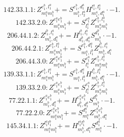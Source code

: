 \documentclass[letterpaper,10pt,fleqn,leqno,onecolumn]{article}
\begin{document}
\begin{equation} \;\;\;\;\;\;  142.33.1.1: Z^{e_{1}^{b},l_{1}^{a}}_{m_{1}^{a}m_{1}^{b}}+=S^{e_{1}^{b},d_{1}^{a}}_{m_{1}^{b},l_{2}^{a}}H^{l_{1}^{a},l_{2}^{a}}_{m_{1}^{a},d_{1}^{a}}\cdot -1. \end{equation}
\begin{equation} \;\;\;\;\;\;  142.33.2.0: Z^{e_{1}^{a}e_{1}^{b}}_{m_{1}^{a}m_{1}^{b}}+=S^{e_{1}^{a}}_{l_{1}^{a}}Z^{e_{1}^{b},l_{1}^{a}}_{m_{1}^{a}m_{1}^{b}} \end{equation}
\begin{equation} \;\;\;\;\;\;  206.44.1.2: Z^{l_{1}^{b},l_{1}^{a}}_{m_{1}^{b},d_{1}^{a}}+=H^{l_{1}^{b},l_{1}^{a}}_{d_{1}^{b},d_{1}^{a}}S^{d_{1}^{b}}_{m_{1}^{b}}\cdot -1. \end{equation}
\begin{equation} \;\;\;\;\;\;  206.44.2.1: Z^{e_{1}^{b},l_{1}^{a}}_{m_{1}^{a}m_{1}^{b}}+=S^{e_{1}^{b},d_{1}^{a}}_{m_{1}^{a},l_{1}^{b}}Z^{l_{1}^{b},l_{1}^{a}}_{m_{1}^{b},d_{1}^{a}} \end{equation}
\begin{equation} \;\;\;\;\;\;  206.44.3.0: Z^{e_{1}^{a}e_{1}^{b}}_{m_{1}^{a}m_{1}^{b}}+=S^{e_{1}^{a}}_{l_{1}^{a}}Z^{e_{1}^{b},l_{1}^{a}}_{m_{1}^{a}m_{1}^{b}} \end{equation}
\begin{equation} \;\;\;\;\;\;  139.33.1.1: Z^{e_{1}^{b},l_{1}^{a}}_{m_{1}^{a}m_{1}^{b}}+=S^{e_{1}^{b},d_{1}^{a}}_{m_{1}^{a},l_{1}^{b}}H^{l_{1}^{b},l_{1}^{a}}_{m_{1}^{b},d_{1}^{a}}\cdot -1. \end{equation}
\begin{equation} \;\;\;\;\;\;  139.33.2.0: Z^{e_{1}^{a}e_{1}^{b}}_{m_{1}^{a}m_{1}^{b}}+=S^{e_{1}^{a}}_{l_{1}^{a}}Z^{e_{1}^{b},l_{1}^{a}}_{m_{1}^{a}m_{1}^{b}} \end{equation}
\begin{equation} \;\;\;\;\;\;  77.22.1.1: Z^{e_{1}^{a}e_{1}^{b}}_{m_{1}^{b},d_{1}^{a}}+=H^{e_{1}^{a}e_{1}^{b}}_{d_{1}^{b},d_{1}^{a}}S^{d_{1}^{b}}_{m_{1}^{b}}\cdot -1. \end{equation}
\begin{equation} \;\;\;\;\;\;  77.22.2.0: Z^{e_{1}^{a}e_{1}^{b}}_{m_{1}^{a}m_{1}^{b}}+=S^{d_{1}^{a}}_{m_{1}^{a}}Z^{e_{1}^{a}e_{1}^{b}}_{m_{1}^{b},d_{1}^{a}} \end{equation}
\begin{equation} \;\;\;\;\;\;  145.34.1.1: Z^{l_{1}^{a}l_{1}^{b}}_{m_{1}^{a}m_{1}^{b}}+=H^{l_{1}^{a}l_{1}^{b}}_{m_{1}^{b},d_{1}^{a}}S^{d_{1}^{a}}_{m_{1}^{a}}\cdot -1. \end{equation}
\end{document}
